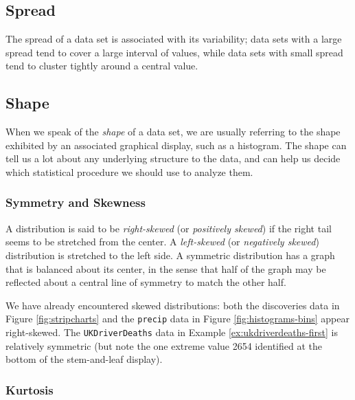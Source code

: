 \documentclass[]{book}
\numberwithin{equation}{chapter}
\numberwithin{figure}{chapter}
\theoremstyle{plain}
\theoremstyle{definition}
\theoremstyle{remark}
\theoremstyle{definition}
\theoremstyle{definition}
\theoremstyle{remark}
\begin{document}
\subsection{Spread}\label{sub-spread}

The spread of a data set is associated with its variability; data sets
with a large spread tend to cover a large interval of values, while data
sets with small spread tend to cluster tightly around a central value.

\subsection{Shape}\label{sub-shape}

When we speak of the \emph{shape} of a data set, we are usually
referring to the shape exhibited by an associated graphical display,
such as a histogram. The shape can tell us a lot about any underlying
structure to the data, and can help us decide which statistical
procedure we should use to analyze them.

\subsubsection{Symmetry and Skewness}\label{symmetry-and-skewness}

A distribution is said to be \emph{right-skewed} (or \emph{positively
skewed}) if the right tail seems to be stretched from the center. A
\emph{left-skewed} (or \emph{negatively skewed}) distribution is
stretched to the left side. A symmetric distribution has a graph that is
balanced about its center, in the sense that half of the graph may be
reflected about a central line of symmetry to match the other half.

We have already encountered skewed distributions: both the discoveries
data in Figure \ref{fig:stripcharts} and the \texttt{precip} data in
Figure \ref{fig:histograms-bins} appear right-skewed. The
\texttt{UKDriverDeaths} data in Example \ref{ex:ukdriverdeaths-first} is
relatively symmetric (but note the one extreme value 2654 identified at
the bottom of the stem-and-leaf display).

\subsubsection{Kurtosis}\label{kurtosis}
\end{document}
